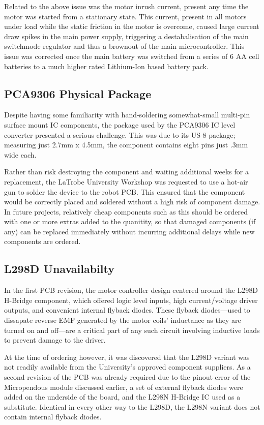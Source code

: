 Related to the above issue was the motor inrush current, present any time the motor was started from a stationary state. This current, present in all motors under load while the static friction in the motor is overcome, caused large current draw spikes in the main power supply, triggering a destabalisation of the main switchmode regulator and thus a brownout of the main microcontroller. This issue was corrected once the main battery was switched from a series of 6 AA cell batteries to a much higher rated Lithium-Ion based battery pack.

\subsection{PCA9306 Physical Package}

Despite having some familiarity with hand-soldering somewhat-small multi-pin surface mount IC components, the package used by the PCA9306 IC level converter presented a serious challenge. This was due to its US-8 package; measuring just 2.7mm x 4.5mm, the component contains eight pins just .3mm wide each.

Rather than risk destroying the component and waiting additional weeks for a replacement, the LaTrobe University Workshop was requested to use a hot-air gun to solder the device to the robot PCB. This ensured that the component would be correctly placed and soldered without a high risk of component damage. In future projects, relatively cheap components such as this should be ordered with one or more extras added to the quanitity, so that damaged components (if any) can be replaced immediately without incurring additional delays while new components are ordered. 

\subsection{L298D Unavailabilty}

In the first PCB revision, the motor controller design centered around the L298D H-Bridge component, which offered logic level inputs, high current/voltage driver outputs, and convenient internal flyback diodes. These flyback diodes---used to dissapate reverse EMF generated by the motor coils' inductance as they are turned on and off---are a critical part of any such circuit involving inductive loads to prevent damage to the driver.

At the time of ordering however, it was discovered that the L298D variant was not readily available from the University's approved component suppliers. As a second revision of the PCB was already required due to the pinout error of the Micropendous module discussed earlier, a set of external flyback diodes were added on the underside of the board, and the L298N H-Bridge IC used as a substitute. Identical in every other way to the L298D, the L298N variant does not contain internal flyback diodes.

